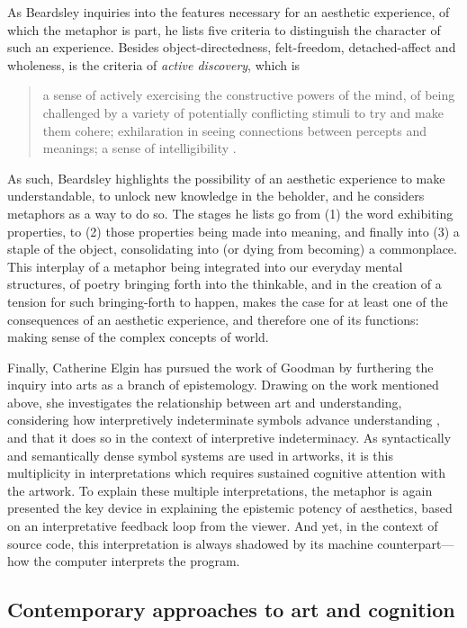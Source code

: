 As Beardsley inquiries into the features necessary for an aesthetic experience, of which the metaphor is part, he lists five criteria to distinguish the character of such an experience. Besides object-directedness, felt-freedom, detached-affect and wholeness, is the criteria of \emph{active discovery}, which is

\begin{quote}
    a sense of actively exercising the constructive powers of the mind, of being challenged by a variety of potentially conflicting stimuli to try and make them cohere; exhilaration in seeing connections between percepts and meanings; a sense of intelligibility \citep{beardsley_aesthetic_1970}.
\end{quote}

As such, Beardsley highlights the possibility of an aesthetic experience to make understandable, to unlock new knowledge in the beholder, and he considers metaphors as a way to do so. The stages he lists go from (1) the word exhibiting properties, to (2) those properties being made into meaning, and finally into (3) a staple of the object, consolidating into (or dying from becoming) a commonplace. This interplay of a metaphor being integrated into our everyday mental structures, of poetry bringing forth into the thinkable, and in the creation of a tension for such bringing-forth to happen, makes the case for at least one of the consequences of an aesthetic experience, and therefore one of its functions: making sense of the complex concepts of world.

Finally, Catherine Elgin has pursued the work of Goodman by furthering the inquiry into arts as a branch of epistemology. Drawing on the work mentioned above, she investigates the relationship between art and understanding, considering how interpretively indeterminate symbols advance understanding \citep{elgin_understanding_2020}, and that it does so in the context of interpretive indeterminacy. As syntactically and semantically dense symbol systems are used in artworks, it is this multiplicity in interpretations which requires sustained cognitive attention with the artwork. To explain these multiple interpretations, the metaphor is again presented the key device in explaining the epistemic potency of aesthetics, based on an interpretative feedback loop from the viewer. And yet, in the context of source code, this interpretation is always shadowed by its machine counterpart—how the computer interprets the program.

\subsection{Contemporary approaches to art and cognition}
\label{subsec:art-cognition-contemporary}

